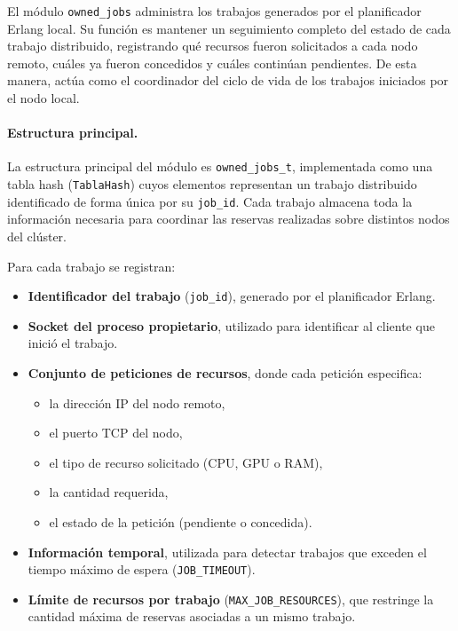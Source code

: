 \documentclass[12pt,a4paper]{article}
\begin{document}
El módulo \texttt{owned\_jobs} administra los trabajos generados por el planificador Erlang local. Su función es mantener un seguimiento completo del estado de cada trabajo distribuido, registrando qué recursos fueron solicitados a cada nodo remoto, cuáles ya fueron concedidos y cuáles continúan pendientes. De esta manera, actúa como el coordinador del ciclo de vida de los trabajos iniciados por el nodo local.
 
\paragraph{Estructura principal.}
La estructura principal del módulo es \texttt{owned\_jobs\_t}, implementada como una tabla hash (\texttt{TablaHash}) cuyos elementos representan un trabajo distribuido identificado de forma única por su \texttt{job\_id}. Cada trabajo almacena toda la información necesaria para coordinar las reservas realizadas sobre distintos nodos del clúster.
 
Para cada trabajo se registran:
 
\begin{itemize}
    \item \textbf{Identificador del trabajo} (\texttt{job\_id}), generado por el planificador Erlang.
    \item \textbf{Socket del proceso propietario}, utilizado para identificar al cliente que inició el trabajo.
    \item \textbf{Conjunto de peticiones de recursos}, donde cada petición especifica:
    \begin{itemize}
        \item la dirección IP del nodo remoto,
        \item el puerto TCP del nodo,
        \item el tipo de recurso solicitado (CPU, GPU o RAM),
        \item la cantidad requerida,
        \item el estado de la petición (pendiente o concedida).
    \end{itemize}
    \item \textbf{Información temporal}, utilizada para detectar trabajos que exceden el tiempo máximo de espera (\texttt{JOB\_TIMEOUT}).
    \item \textbf{Límite de recursos por trabajo} (\texttt{MAX\_JOB\_RESOURCES}), que restringe la cantidad máxima de reservas asociadas a un mismo trabajo.
\end{itemize}
 
\end{document}
